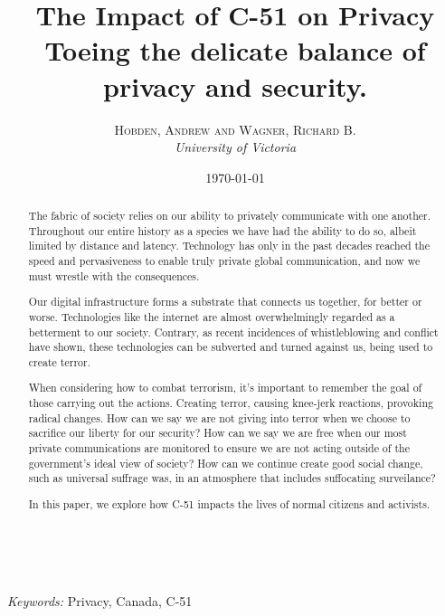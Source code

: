 \documentclass[a4paper, 11pt]{article} %
\title{
    \textbf{The Impact of C-51 on Privacy}\\ %
    Toeing the delicate balance of privacy and security.
} %
\author{\textsc{Hobden, Andrew and Wagner, Richard B.} %
\\{\textit{University of Victoria}}} %
\date{\today} %
\makeatletter
\renewcommand{\maketitle}{ %
\begin{flushright} %
{\LARGE\@title} %

\vspace{50pt} %

{\large\@author} %
\\\@date %

\vspace{40pt} %
\end{flushright}
}
\makeatother
\begin{document}
\maketitle %



\begin{abstract}
The fabric of society relies on our ability to privately communicate with one another. Throughout our entire history as a species we have had the ability to do so, albeit limited by distance and latency. Technology has only in the past decades reached the speed and pervasiveness to enable truly private global communication, and now we must wrestle with the consequences.

Our digital infrastructure forms a substrate that connects us together, for better or worse. Technologies like the internet are almost overwhelmingly regarded as a betterment to our society. Contrary, as recent incidences of whistleblowing and conflict have shown, these technologies can be subverted and turned against us, being used to create terror.

When considering how to combat terrorism, it's important to remember the goal of those carrying out the actions. Creating terror, causing knee-jerk reactions, provoking radical changes. How can we say we are not giving into terror when we choose to sacrifice our liberty for our security? How can we say we are free when our most private communications are monitored to ensure we are not acting outside of the government's ideal view of society? How can we continue create good social change, such as universal suffrage was, in an atmosphere that includes suffocating surveilance?

In this paper, we explore how C-51 impacts the lives of normal citizens and activists.
\end{abstract}

\hspace*{3,6mm}\textit{Keywords:} Privacy, Canada, C-51 %

\vspace{30pt} %

\end{document}
